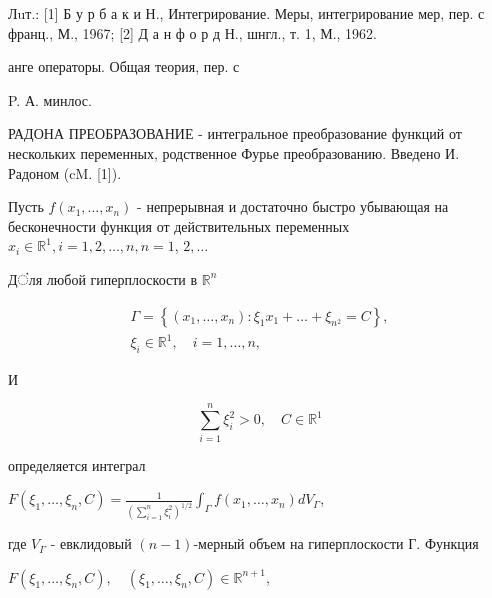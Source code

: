 \documentclass[10pt]{article}
\begin{document}
Лuт.: [1] Б у р б а к и Н., Интегрирование. Меры, интегрирование мер, пер. с франц., М., 1967; [2] Д а н ф о р д Н., шнгл., т. 1, М., 1962.

анге операторы. Общая теория, пер. с

P. А. минлос.



РАДОНА ПРЕОБРАЗОВАНИЕ - интегральное преобразование функций от нескольких переменных, родственное Фурье преобразованию. Введено И. Радоном (cM. [1]).



Пусть $f\left(x_{1}, \ldots, x_{n}\right)$ - непрерывная и достаточно быстро убывающая на бесконечности функция от действительных переменных $x_{i} \in \mathbb{R}^{1}, i=1,2, \ldots, n, n=1$, $2, \ldots$



Дंля любой гиперплоскости в $\mathbb{R}^{n}$



\[

\begin{gathered}

\Gamma=\left\{\left(x_{1}, \ldots, x_{n}\right): \xi_{1} x_{1}+\ldots+\xi_{n^{2}}=C\right\}, \\

\xi_{i} \in \mathbb{R}^{1}, \quad i=1, \ldots, n,

\end{gathered}

\]



И



\[

\sum_{i=1}^{n} \xi_{i}^{2}>0, \quad C \in \mathbb{R}^{1}

\]



определяется интеграл



$F\left(\xi_{1}, \ldots, \xi_{n}, C\right)=\frac{1}{\left(\sum_{i=1}^{n} \xi_{i}^{2}\right)^{1 / 2}} \int_{\Gamma} f\left(x_{1}, \ldots, x_{n}\right) d V_{\Gamma}$,



где $V_{\Gamma}$ - евклидовый $(n-1)$-мерный объем на гиперплоскости Г. Функция



$F\left(\xi_{1}, \ldots, \xi_{n}, C\right), \quad\left(\xi_{1}, \ldots, \xi_{n}, C\right) \in \mathbb{R}^{n+1}$,
\end{document}
